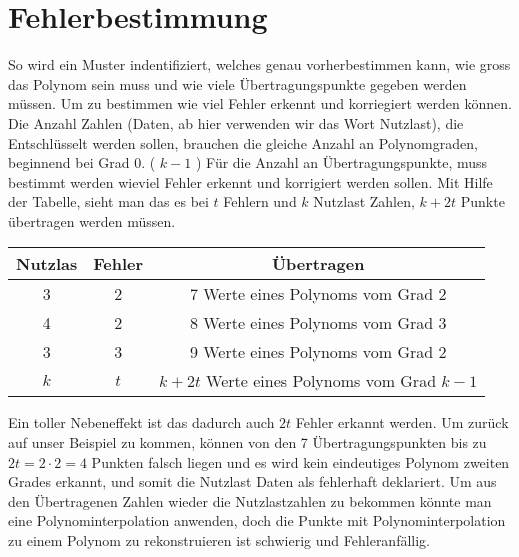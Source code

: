 \section{Fehlerbestimmung
\label{reedsolomon:section:Fehlerbestimmmung}}
So wird ein Muster indentifiziert, welches genau vorherbestimmen kann,
wie gross das Polynom sein muss und wie viele Übertragungspunkte gegeben werden müssen.
Um zu bestimmen wie viel Fehler erkennt und korriegiert werden können.
Die Anzahl Zahlen (Daten, ab hier verwenden wir das Wort Nutzlast),
die Entschlüsselt werden sollen, brauchen die gleiche Anzahl an  Polynomgraden, beginnend bei Grad 0. ( \( k-1 \) )
Für die Anzahl an Übertragungspunkte, muss bestimmt werden wieviel Fehler erkennt und korrigiert werden sollen.
Mit Hilfe der Tabelle, sieht man das es bei $t$ Fehlern und $k$ Nutzlast Zahlen,
$k+2t$ Punkte übertragen werden müssen.
\begin{center}
    \begin{tabular}{ c c c } 
        \hline
        Nutzlas & Fehler & Übertragen \\
        \hline 
        3 & 2 & 7 Werte eines Polynoms vom Grad 2 \\ 
        4 & 2 & 8 Werte eines Polynoms vom Grad 3 \\
        3 & 3 & 9 Werte eines Polynoms vom Grad 2 \\ 
        \hline
        $k$ & $t$ & $k+2t$ Werte eines Polynoms vom Grad $k-1$ \\ 
        \hline
    \end{tabular}
\end{center}
Ein toller Nebeneffekt ist das dadurch auch $2t$ Fehler erkannt werden. 
Um zurück auf unser Beispiel zu kommen, 
können von den 7 Übertragungspunkten bis zu $2t = 2\cdot2 = 4 $ Punkten falsch liegen 
und es wird kein eindeutiges Polynom zweiten Grades erkannt, und somit die Nutzlast Daten als fehlerhaft deklariert.
Um aus den Übertragenen Zahlen wieder die Nutzlastzahlen zu bekommen könnte man eine Polynominterpolation anwenden,
doch die Punkte mit Polynominterpolation zu einem Polynom zu rekonstruieren ist schwierig und Fehleranfällig.

